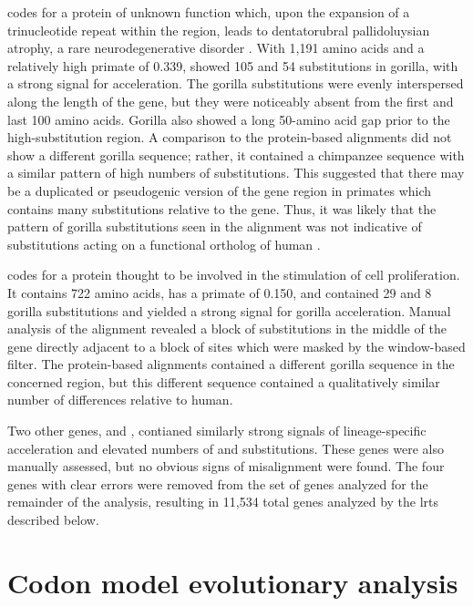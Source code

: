  codes for a protein of unknown function which, upon the
expansion of a trinucleotide repeat within the region, leads to
dentatorubral pallidoluysian atrophy, a rare neurodegenerative
disorder \citep{OkamuraOho1999}. With 1,191 amino acids and a
relatively high primate \dnds of 0.339,  showed 105 \nsyn
and 54 \syn substitutions in gorilla, with a strong signal for
acceleration. The gorilla substitutions were evenly interspersed along
the length of the gene, but they were noticeably absent from the first
and last 100 amino acids. Gorilla also showed a long 50-amino acid gap
prior to the high-substitution region. A comparison to the
protein-based alignments did not show a different gorilla sequence;
rather, it contained a chimpanzee sequence with a similar pattern of
high numbers of substitutions. This suggested that there may be a
duplicated or pseudogenic version of the gene region in primates which
contains many substitutions relative to the  gene. Thus, it
was likely that the pattern of gorilla substitutions seen in the
 alignment was not indicative of substitutions acting on a
functional ortholog of human . 

 codes for a protein thought to be involved in the
stimulation of cell proliferation. It contains 722 amino acids, has a
primate \dnds of 0.150, and contained 29 \nsyn and 8 \nsyn gorilla
substitutions and yielded a strong signal for gorilla
acceleration. Manual analysis of the alignment revealed a block of
\nsyn substitutions in the middle of the gene directly adjacent to a
block of sites which were masked by the window-based filter. The
protein-based alignments contained a different gorilla sequence in the
concerned region, but this different sequence contained a
qualitatively similar number of differences relative to human.

Two other genes,  and , contianed similarly
strong signals of lineage-specific acceleration and elevated numbers
of \nsyn and \syn substitutions. These genes were also manually
assessed, but no obvious signs of misalignment were found. The four
genes with clear errors were removed from the set of genes analyzed
for the remainder of the analysis, resulting in 11,534 total genes
analyzed by the \acp{lrt} described below.

\section{Codon model evolutionary analysis}

